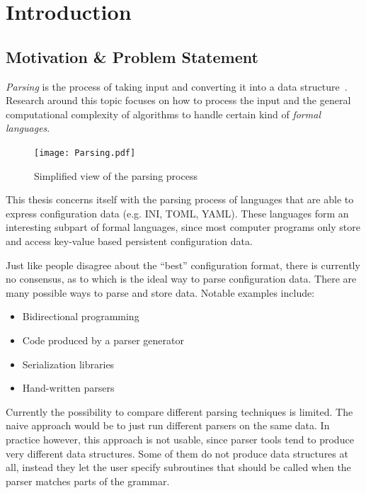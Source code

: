 \chapter{Introduction}

\section{Motivation \& Problem Statement}
\label{sec:Motivation}

\emph{Parsing} is the process of taking input and converting it into a data structure~\cite{wikipedia2016Parser, grune2007parsing}. Research around this topic focuses on how to process the input and the general computational complexity of algorithms to handle certain kind of \emph{formal languages}.

\begin{figure}[H]
  \centering
    \texttt{[image: Parsing.pdf]}
  \caption{Simplified view of the parsing process}
\end{figure}

This thesis concerns itself with the parsing process of languages that are able to express configuration data (e.g. INI, TOML, YAML). These languages form an interesting subpart of formal languages, since most computer programs only store and access key-value based persistent configuration data.

Just like people disagree about the “best” configuration format, there is currently no consensus, as to which is the ideal way to parse configuration data. There are many possible ways to parse and store data. Notable examples include:

\begin{itemize}
  \item Bidirectional programming~\cite{foster2005combinators, bohannon2006relational, lutterkort2008augeas, ko2016bigul, raab2016improving}
  \item Code produced by a parser generator~\cite{denny2008ielr, parr2014adaptive, warth2016modular, bates2017aprt}
  \item Serialization libraries~\cite{sumaray2012cds, pacini2015performance}
  \item Hand-written parsers~\cite{myers2008cparser, bendersky2012clang}
\end{itemize}

Currently the possibility to compare different parsing techniques is limited. The naive approach would be to just run different parsers on the same data. In practice however, this approach is not usable, since parser tools tend to produce very different data structures. Some of them do not produce data structures at all, instead they let the user specify subroutines that should be called when the parser matches parts of the grammar.

